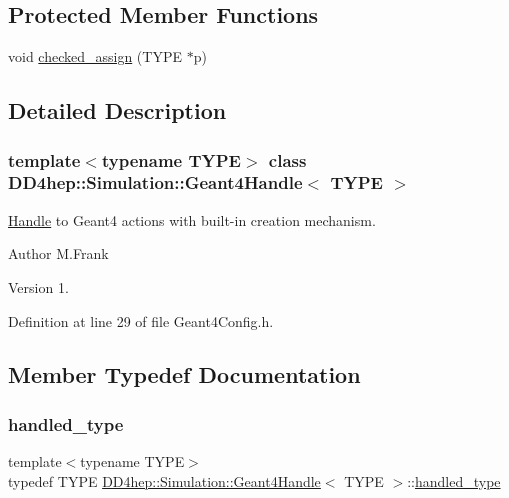 \subsection*{Protected Member Functions}
\begin{DoxyCompactItemize}
\item 
void \hyperlink{class_d_d4hep_1_1_simulation_1_1_geant4_handle_a8c1a9d7f4e2f0b7afee56e54e8e61ccf}{checked\+\_\+assign} (T\+Y\+PE $\ast$p)
\end{DoxyCompactItemize}


\subsection{Detailed Description}
\subsubsection*{template$<$typename T\+Y\+PE$>$\newline
class D\+D4hep\+::\+Simulation\+::\+Geant4\+Handle$<$ T\+Y\+P\+E $>$}

\hyperlink{class_d_d4hep_1_1_handle}{Handle} to Geant4 actions with built-\/in creation mechanism. 

\begin{DoxyAuthor}{Author}
M.\+Frank 
\end{DoxyAuthor}
\begin{DoxyVersion}{Version}
1. 
\end{DoxyVersion}


Definition at line 29 of file Geant4\+Config.\+h.



\subsection{Member Typedef Documentation}
\hypertarget{class_d_d4hep_1_1_simulation_1_1_geant4_handle_a35e583b9228e38c95d23112ad19b645d}{}\label{class_d_d4hep_1_1_simulation_1_1_geant4_handle_a35e583b9228e38c95d23112ad19b645d} 
\subsubsection{\texorpdfstring{handled\+\_\+type}{handled\_type}}
{\footnotesize\ttfamily template$<$typename T\+Y\+PE$>$ \\
typedef T\+Y\+PE \hyperlink{class_d_d4hep_1_1_simulation_1_1_geant4_handle}{D\+D4hep\+::\+Simulation\+::\+Geant4\+Handle}$<$ T\+Y\+PE $>$\+::\hyperlink{class_d_d4hep_1_1_simulation_1_1_geant4_handle_a35e583b9228e38c95d23112ad19b645d}{handled\+\_\+type}}



